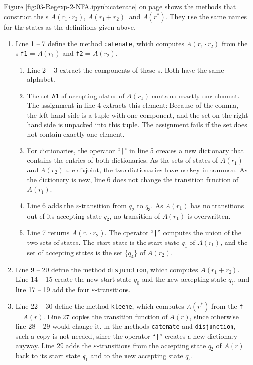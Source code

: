 \noindent
Figure \ref{fig:03-Regexp-2-NFA.ipynb:catenate} on page \pageref{fig:03-Regexp-2-NFA.ipynb:catenate} shows the
methods that construct the s $A(r_1 \cdot r_2)$, $A(r_1 + r_2)$, and $A(r^*)$.  They use the same
names for the states as the definitions given above.
\begin{enumerate}
\item Line 1 -- 7 define the method \texttt{catenate}, which computes $A(r_1 \cdot r_2)$ from the
      s \texttt{f1} = $A(r_1)$ and \texttt{f2} = $A(r_2)$.
      \begin{enumerate}
      \item Line 2 -- 3 extract the components of these s.  Both have the same alphabet.
      \item The set \texttt{A1} of accepting states of $A(r_1)$ contains exactly one element.  The assignment in
            line 4 extracts this element:  Because of the comma, the left hand side is a tuple with one
            component, and the set on the right hand side is unpacked into this tuple.  The assignment fails
            if the set does not contain exactly one element.
      \item For dictionaries, the operator ``\texttt{|}'' in line 5 creates a new dictionary that contains the
            entries of both dictionaries.  As the sets of states of $A(r_1)$ and $A(r_2)$ are disjoint, the two
            dictionaries have no key in common.  As the dictionary is new, line 6 does not change the
            transition function of $A(r_1)$.
      \item Line 6 adds the $\varepsilon$-transition from $q_2$ to $q_3$.  As $A(r_1)$ has no transitions out
            of its accepting state $q_2$, no transition of $A(r_1)$ is overwritten.
      \item Line 7 returns $A(r_1 \cdot r_2)$.  The operator ``\texttt{|}'' computes the union of the two sets
            of states.  The start state is the start state $q_1$ of $A(r_1)$, and the set of accepting states is
            the set $\{ q_4 \}$ of $A(r_2)$.
      \end{enumerate}
\item Line 9 -- 20 define the method \texttt{disjunction}, which computes $A(r_1 + r_2)$.  Line 14 -- 15
      create the new start state $q_0$ and the new accepting state $q_5$, and line 17 -- 19 add the four
      $\varepsilon$-transitions.
\item Line 22 -- 30 define the method \texttt{kleene}, which computes $A(r^*)$ from the 
      \texttt{f} = $A(r)$.  Line 27 copies the transition function of $A(r)$, since otherwise line 28 -- 29
      would change it.  In the methods \texttt{catenate} and \texttt{disjunction}, such a copy is not needed,
      since the operator ``\texttt{|}'' creates a new dictionary anyway.  Line 29 adds the
      $\varepsilon$-transitions from the accepting state $q_2$ of $A(r)$ back to its start state $q_1$ and to the
      new accepting state $q_3$.
\end{enumerate}
